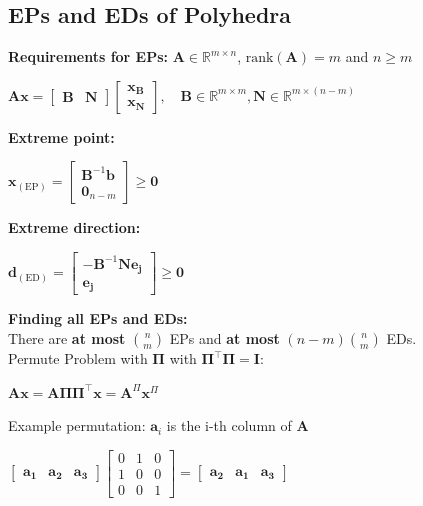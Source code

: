 \documentclass[english]{latex4ei/latex4ei_sheet}
\begin{document}
\begin{sectionbox}
	\subsection{EPs and EDs of Polyhedra}
	\textbf{Requirements for EPs: } $\bm{A} \in \mathbb{R}^{m \times n}$, $\text{rank}(\bm{A}) = m$ and $n \geq m$
	\begin{center}
		$\bm{A}\bm{x} = \begin{bmatrix}
			\bm{B} & \bm{N}
		\end{bmatrix} \begin{bmatrix}
		\bm{x_B} \\
		\bm{x_N}
	\end{bmatrix}, \quad \bm{B} \in \mathbb{R}^{m \times m}, \bm{N} \in \mathbb{R}^{m \times (n-m)}$
	\end{center}
	\textbf{Extreme point:}
	\begin{center}
		$\bm{x}_{(\text{EP})} = \begin{bmatrix}
			\bm{B}^{-1}\bm{b} \\
			\bm{0}_{n-m}
		\end{bmatrix} \geq \bm{0}$
	\end{center}
	\textbf{Extreme direction:}
	\begin{center}
		$\bm{d}_{(\text{ED})} =  \begin{bmatrix}
			-\bm{B}^{-1}\bm{N}\bm{e_j} \\
			\bm{e_j}
		\end{bmatrix}  \geq \bm{0}$
	\end{center}
	\textbf{Finding all EPs and EDs:} \\
	There are \textbf{at most} $\binom{n}{m}$ EPs and \textbf{at most} $(n-m)\binom{n}{m}$ EDs. \\
	Permute Problem with $\bm{\Pi}$ with $\bm{\Pi}^\intercal\bm{\Pi} = \bm{I}$:
	\begin{center}
		$\bm{A}\bm{x} = \bm{A}\bm{\Pi}\bm{\Pi}^\intercal\bm{x} = \bm{A}^{\Pi}\bm{x}^{\Pi}$
	\end{center}
	Example permutation: $\bm{a}_i$ is the i-th column of $\bm{A}$ \\
	\begin{center}
		$\begin{bmatrix}
			\bm{a_1} & \bm{a_2} & \bm{a_3}
		\end{bmatrix} \begin{bmatrix}
			0 & 1 & 0 \\
			1 & 0 & 0 \\
			0 & 0 & 1
	\end{bmatrix} = \begin{bmatrix}
	\bm{a_2} & \bm{a_1} & \bm{a_3}
\end{bmatrix}$
	\end{center}
	
\end{sectionbox}
\end{document}
